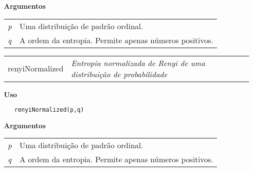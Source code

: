 \textbf{Argumentos}

\begin{table}[!ht]
\begin{center}
\begin{tabularx}{\textwidth}{X X}
\hspace{0.5cm} \textit{p} \vspace{0.5cm}& Uma distribuição de padrão ordinal.\vspace{0.5cm}\\
\hspace{0.5cm} \textit{q} \vspace{0.5cm}& A ordem da entropia. Permite apenas números positivos.\vspace{0.5cm}\\
\end{tabularx}
\end{center}
\end{table} 
\newpage


\hrulefill   

\begin{table}[!ht]
\begin{center}
\begin{tabularx}{\textwidth}{ X X}
\hspace{0.5cm} renyiNormalized & \textit{Entropia normalizada de Renyi de uma distribuição de probabilidade}\\
\end{tabularx}
\end{center}
\end{table} 

\vspace{-0.5cm}

\hrulefill  

\vspace{0.5cm}

\textbf{Uso}

\begin{lstlisting}
   renyiNormalized(p,q)
\end{lstlisting}

\vspace{0.5cm}

\textbf{Argumentos}

\begin{table}[!ht]
\begin{center}
\begin{tabularx}{\textwidth}{X X}
\hspace{0.5cm} \textit{p} \vspace{0.5cm}& Uma distribuição de padrão ordinal.\vspace{0.5cm}\\
\hspace{0.5cm} \textit{q} \vspace{0.5cm}& A ordem da entropia. Permite apenas números positivos.\vspace{0.5cm}\\
\end{tabularx}
\end{center}
\end{table} 

